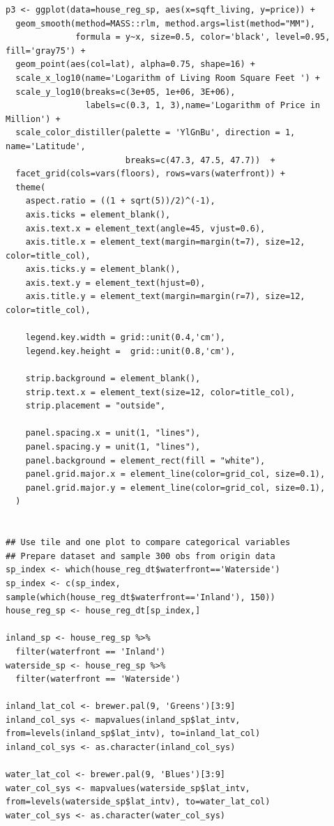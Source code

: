 \documentclass[11pt,letterpaper]{article}
\begin{document}
\begin{verbatim}
p3 <- ggplot(data=house_reg_sp, aes(x=sqft_living, y=price)) +
  geom_smooth(method=MASS::rlm, method.args=list(method="MM"),
              formula = y~x, size=0.5, color='black', level=0.95, fill='gray75') +
  geom_point(aes(col=lat), alpha=0.75, shape=16) + 
  scale_x_log10(name='Logarithm of Living Room Square Feet ') +
  scale_y_log10(breaks=c(3e+05, 1e+06, 3E+06), 
                labels=c(0.3, 1, 3),name='Logarithm of Price in Million') +
  scale_color_distiller(palette = 'YlGnBu', direction = 1, name='Latitude',
                        breaks=c(47.3, 47.5, 47.7))  +
  facet_grid(cols=vars(floors), rows=vars(waterfront)) +
  theme(
    aspect.ratio = ((1 + sqrt(5))/2)^(-1),
    axis.ticks = element_blank(),
    axis.text.x = element_text(angle=45, vjust=0.6),
    axis.title.x = element_text(margin=margin(t=7), size=12, color=title_col),
    axis.ticks.y = element_blank(),
    axis.text.y = element_text(hjust=0),
    axis.title.y = element_text(margin=margin(r=7), size=12, color=title_col),
    
    legend.key.width = grid::unit(0.4,'cm'),
    legend.key.height =  grid::unit(0.8,'cm'),
    
    strip.background = element_blank(),
    strip.text.x = element_text(size=12, color=title_col), 
    strip.placement = "outside",      
    
    panel.spacing.x = unit(1, "lines"), 
    panel.spacing.y = unit(1, "lines"),
    panel.background = element_rect(fill = "white"),
    panel.grid.major.x = element_line(color=grid_col, size=0.1),
    panel.grid.major.y = element_line(color=grid_col, size=0.1),
  )


## Use tile and one plot to compare categorical variables 
## Prepare dataset and sample 300 obs from origin data
sp_index <- which(house_reg_dt$waterfront=='Waterside')
sp_index <- c(sp_index, sample(which(house_reg_dt$waterfront=='Inland'), 150))
house_reg_sp <- house_reg_dt[sp_index,]

inland_sp <- house_reg_sp %>% 
  filter(waterfront == 'Inland')
waterside_sp <- house_reg_sp %>%
  filter(waterfront == 'Waterside')

inland_lat_col <- brewer.pal(9, 'Greens')[3:9]
inland_col_sys <- mapvalues(inland_sp$lat_intv, from=levels(inland_sp$lat_intv), to=inland_lat_col)
inland_col_sys <- as.character(inland_col_sys)

water_lat_col <- brewer.pal(9, 'Blues')[3:9]
water_col_sys <- mapvalues(waterside_sp$lat_intv, from=levels(waterside_sp$lat_intv), to=water_lat_col)
water_col_sys <- as.character(water_col_sys)


\end{verbatim}
\end{document}
